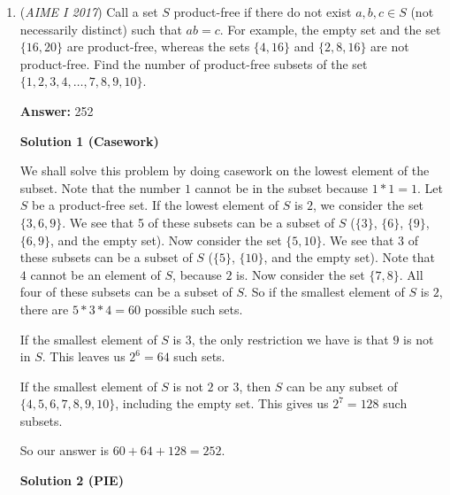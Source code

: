 \begin{enumerate}
 There are $12+12+8+24+20+12+36+24+12=160$ combinations in total. For each of our combinations, there are $3!$ ways to permute each of the rows. There are also $3!$ ways to decide the order of the rows. Therefore, $Q=1296\cdot 160=207360$.

 The requested answer is $\boxed{360}$.

 


	\item (\textit{AIME I 2017}) Call a set $S$ product-free if there do not exist $a, b, c \in S$ (not necessarily distinct) such that $a b = c$. For example, the empty set and the set $\{16, 20\}$ are product-free, whereas the sets $\{4, 16\}$ and $\{2, 8, 16\}$ are not product-free. Find the number of product-free subsets of the set $\{1, 2, 3, 4, \ldots, 7, 8, 9, 10\}$.


 
 \textbf{Answer: }252



\textbf{Solution 1 (Casework)}

We shall solve this problem by doing casework on the lowest element of the subset. Note that the number $1$ cannot be in the subset because $1*1=1$. Let $S$ be a product-free set. If the lowest element of $S$ is $2$, we consider the set $\{3, 6, 9\}$. We see that 5 of these subsets can be a subset of $S$ ($\{3\}$, $\{6\}$, $\{9\}$, $\{6, 9\}$, and the empty set). Now consider the set $\{5, 10\}$. We see that 3 of these subsets can be a subset of $S$ ($\{5\}$, $\{10\}$, and the empty set). Note that $4$ cannot be an element of $S$, because $2$ is. Now consider the set $\{7, 8\}$. All four of these subsets can be a subset of $S$. So if the smallest element of $S$ is $2$, there are $5*3*4=60$ possible such sets.

 If the smallest element of $S$ is $3$, the only restriction we have is that $9$ is not in $S$. This leaves us $2^6=64$ such sets.

 If the smallest element of $S$ is not $2$ or $3$, then $S$ can be any subset of $\{4, 5, 6, 7, 8, 9, 10\}$, including the empty set. This gives us $2^7=128$ such subsets.

 So our answer is $60+64+128=\boxed{252}$.

 



\textbf{Solution 2 (PIE)}


\end{enumerate}
